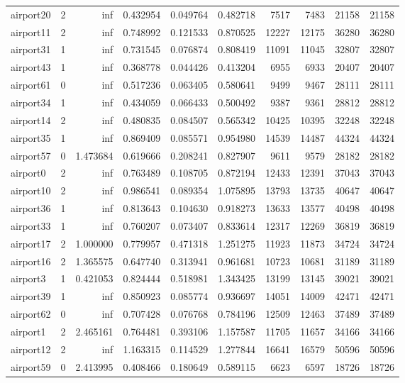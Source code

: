 \begin{longtable}{|l|r|r|r|r|r|r|r|r|r|}
airport20 & 2 & inf & 0.432954 & 0.049764 & 0.482718 & 7517 & 7483 & 21158 & 21158 \\
airport11 & 2 & inf & 0.748992 & 0.121533 & 0.870525 & 12227 & 12175 & 36280 & 36280 \\
airport31 & 1 & inf & 0.731545 & 0.076874 & 0.808419 & 11091 & 11045 & 32807 & 32807 \\
airport43 & 1 & inf & 0.368778 & 0.044426 & 0.413204 & 6955 & 6933 & 20407 & 20407 \\
airport61 & 0 & inf & 0.517236 & 0.063405 & 0.580641 & 9499 & 9467 & 28111 & 28111 \\
airport34 & 1 & inf & 0.434059 & 0.066433 & 0.500492 & 9387 & 9361 & 28812 & 28812 \\
airport14 & 2 & inf & 0.480835 & 0.084507 & 0.565342 & 10425 & 10395 & 32248 & 32248 \\
airport35 & 1 & inf & 0.869409 & 0.085571 & 0.954980 & 14539 & 14487 & 44324 & 44324 \\
airport57 & 0 & 1.473684 & 0.619666 & 0.208241 & 0.827907 & 9611 & 9579 & 28182 & 28182 \\
airport0 & 2 & inf & 0.763489 & 0.108705 & 0.872194 & 12433 & 12391 & 37043 & 37043 \\
airport10 & 2 & inf & 0.986541 & 0.089354 & 1.075895 & 13793 & 13735 & 40647 & 40647 \\
airport36 & 1 & inf & 0.813643 & 0.104630 & 0.918273 & 13633 & 13577 & 40498 & 40498 \\
airport33 & 1 & inf & 0.760207 & 0.073407 & 0.833614 & 12317 & 12269 & 36819 & 36819 \\
airport17 & 2 & 1.000000 & 0.779957 & 0.471318 & 1.251275 & 11923 & 11873 & 34724 & 34724 \\
airport16 & 2 & 1.365575 & 0.647740 & 0.313941 & 0.961681 & 10723 & 10681 & 31189 & 31189 \\
airport3 & 1 & 0.421053 & 0.824444 & 0.518981 & 1.343425 & 13199 & 13145 & 39021 & 39021 \\
airport39 & 1 & inf & 0.850923 & 0.085774 & 0.936697 & 14051 & 14009 & 42471 & 42471 \\
airport62 & 0 & inf & 0.707428 & 0.076768 & 0.784196 & 12509 & 12463 & 37489 & 37489 \\
airport1 & 2 & 2.465161 & 0.764481 & 0.393106 & 1.157587 & 11705 & 11657 & 34166 & 34166 \\
airport12 & 2 & inf & 1.163315 & 0.114529 & 1.277844 & 16641 & 16579 & 50596 & 50596 \\
airport59 & 0 & 2.413995 & 0.408466 & 0.180649 & 0.589115 & 6623 & 6597 & 18726 & 18726 \\

\end{longtable}
